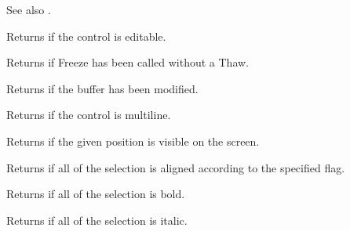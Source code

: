 See also .

\label{wxrichtextctrliseditable}


Returns \true if the control is editable.

\label{wxrichtextctrlisfrozen}


Returns \true if Freeze has been called without a Thaw.

\label{wxrichtextctrlismodified}


Returns \true if the buffer has been modified.

\label{wxrichtextctrlismultiline}


Returns \true if the control is multiline.

\label{wxrichtextctrlispositionvisible}


Returns \true if the given position is visible on the screen.

\label{wxrichtextctrlisselectionaligned}


Returns \true if all of the selection is aligned according to the specified flag.

\label{wxrichtextctrlisselectionbold}


Returns \true if all of the selection is bold.

\label{wxrichtextctrlisselectionitalics}


Returns \true if all of the selection is italic.

\label{wxrichtextctrlisselectionunderlined}

